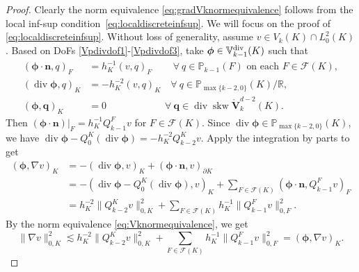 \documentclass[10pt]{amsart}
\renewcommand{\div}{\operatorname{div}}
\newcommand{\skw}{\operatorname{skw}}
\numberwithin{equation}{section}
\begin{document}
\begin{proof}
Clearly the norm equivalence \eqref{eq:gradVknormequivalence} follows from the local inf-sup condition~\eqref{eq:localdiscreteinfsup}. We will focus on the proof of \eqref{eq:localdiscreteinfsup}.
Without loss of generality, assume $v\in V_k(K)\cap L_0^2(K)$.
Based on DoFs \eqref{Vpdivdof1}-\eqref{Vpdivdof3}, take $\boldsymbol{\phi}\in\mathbb{V}_{k-1}^{\rm div}(K)$ such that
\begin{align*}
(\boldsymbol{\phi}\cdot\boldsymbol{n}, q)_F&=h_K^{-1}(v, q)_F  \quad\quad\,\forall~q\in\mathbb P_{k-1}(F) \textrm{ on each }  F\in\mathcal F(K), \\
(\div\boldsymbol{\phi}, q)_K&=-h_K^{-2}(v, q)_K  \quad\forall~q\in\mathbb P_{\max\{k-2,0\}}(K)/\mathbb R, \\
(\boldsymbol{\phi}, \boldsymbol{q})_K&=0  \qquad\qquad\qquad\forall~\boldsymbol{q}\in \div\skw\mathring{\boldsymbol{V}}_{k}^{d-2}(K). 
\end{align*}
Then $(\boldsymbol{\phi}\cdot\boldsymbol{n})|_{F}=h_K^{-1}Q_{k-1}^Fv$ for $F\in\mathcal F(K)$. Since $\div\boldsymbol{\phi}\in \mathbb P_{\max\{k-2,0\}}(K)$, we have $\div\boldsymbol{\phi}-Q_{0}^K(\div\boldsymbol{\phi})=-h_K^{-2}Q_{k-2}^Kv$. Apply the integration by parts to get
\begin{align*}
(\boldsymbol{\phi}, \nabla v)_K&=-(\div\boldsymbol{\phi}, v)_K + (\boldsymbol{\phi}\cdot\boldsymbol{n}, v)_{\partial K} \\
&=-(\div\boldsymbol{\phi}-Q_{0}^K(\div\boldsymbol{\phi}), v)_K+\sum_{F\in\mathcal F(K)}(\boldsymbol{\phi}\cdot\boldsymbol{n}, Q_{k-1}^Fv)_{F} \\
&=h_K^{-2}\|Q_{k-2}^Kv\|_{0,K}^2+\sum_{F\in\mathcal F(K)}h_K^{-1}\|Q_{k-1}^Fv\|_{0,F}^2.
\end{align*}
By the norm equivalence \eqref{eq:Vknormequivalence}, we get
\begin{equation}\label{eq:20220204}
\|\nabla v\|_{0,K}^{2}\lesssim h_K^{-2}\|Q_{k-2}^Kv\|_{0,K}^2+\sum_{F\in\mathcal F(K)}h_K^{-1}\|Q_{k-1}^Fv\|_{0,F}^2= (\boldsymbol{\phi}, \nabla v)_K.
\end{equation}


\end{proof}
\end{document}
